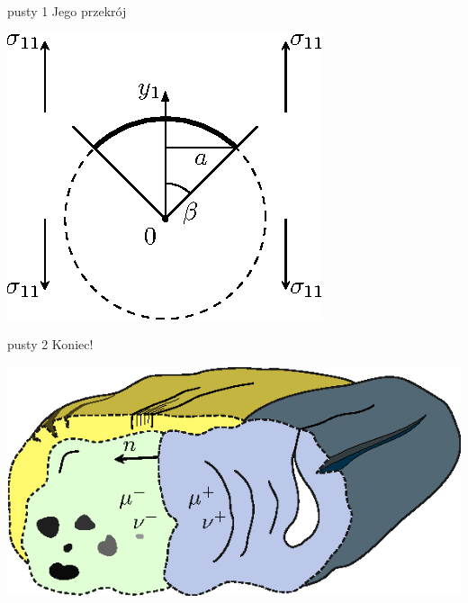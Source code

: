 \documentclass[
  size=14pt,
  mode=present,
  paper=a4paper,
  clock,
  style=sailor
]{powerdot}			%
\begin{document}
\begin{emptyslide}{pusty 1}
	\centering
	Jego przekrój
	
	\includegraphics[height=0.6\slideheight]
	{fig_onsolving3d_crosssection_cylindrical.eps}
\end{emptyslide}

\begin{emptyslide}{pusty 2}
	\centering
	Koniec!
	
	\includegraphics[height=0.6\slideheight]{fig_onsolving3d_blocks.eps}
	
\end{emptyslide}
\end{document}

